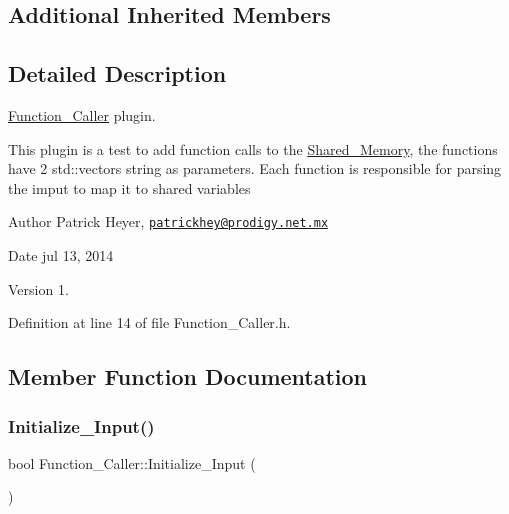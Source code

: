 \subsection*{Additional Inherited Members}


\subsection{Detailed Description}
\hyperlink{class_function___caller}{Function\+\_\+\+Caller} plugin. 

This plugin is a test to add function calls to the \hyperlink{class_shared___memory}{Shared\+\_\+\+Memory}, the functions have 2 std\+::vectors string as parameters. Each function is responsible for parsing the imput to map it to shared variables \begin{DoxyAuthor}{Author}
Patrick Heyer, \href{mailto:patrickhey@prodigy.net.mx}{\tt patrickhey@prodigy.\+net.\+mx} 
\end{DoxyAuthor}
\begin{DoxyDate}{Date}
jul 13, 2014 
\end{DoxyDate}
\begin{DoxyVersion}{Version}
1. 
\end{DoxyVersion}


Definition at line 14 of file Function\+\_\+\+Caller.\+h.



\subsection{Member Function Documentation}
\mbox{\label{class_function___caller_a9b879313b891d3e60b105f94e3fd71cf}} 
\subsubsection{\texorpdfstring{Initialize\+\_\+\+Input()}{Initialize\_Input()}}
{\footnotesize\ttfamily bool Function\+\_\+\+Caller\+::\+Initialize\+\_\+\+Input (\begin{DoxyParamCaption}{ }\end{DoxyParamCaption})\hspace{0.3cm}{\ttfamily [virtual]}}



